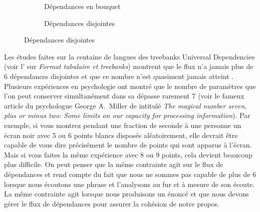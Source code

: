 {    \begin{figure}[H]
    \caption{Configurations de dépendances à un point du flux}
    \begin{subfigure}[b]{.5\linewidth}\centering
    \caption{Dépendances en bouquet}
    \end{subfigure}%
    \begin{subfigure}[b]{.5\linewidth}\centering
    \caption{Dépendances disjointes}
    \end{subfigure}
    \end{figure}
 
    Les études faites sur la centaine de langues des treebanks Universal Dependencies (voir l' sur \textit{Format tabulaire et treebanks})
    montrent que le flux n’a jamais plus de 6 dépendances disjointes et que ce nombre n’est quasiment jamais atteint \citep{kahane2017limitations}.
    Plusieurs expériences en psychologie ont montré que le nombre de paramètres que l’on peut conserver simultanément dans sa  dépasse rarement 7 (voir le fameux article du psychologue George A.\ Miller de \citeyear{miller1956magical} intitulé \textit{The magical number seven, plus or minus two: Some limits on our capacity for processing information}). Par exemple, si vous montrez pendant une fraction de seconde à une personne un écran noir avec 5 ou 6 points blancs disposés aléatoirement, elle devrait être capable de vous dire précisément le nombre de points qui sont apparus à l’écran. Mais si vous faites la même expérience avec 8 ou 9 points, cela devient beaucoup plus difficile. On peut penser que la même contrainte agit sur le flux de dépendances et rend compte du fait que nous ne sommes pas capable de  plus de 6  lorsque nous écoutons une phrase et l’analysons au fur et à mesure de son écoute. La même contrainte agit lorsque nous produisons un énoncé et que nous devons gérer le flux de dépendances pour assurer la cohésion de notre propos.

}
